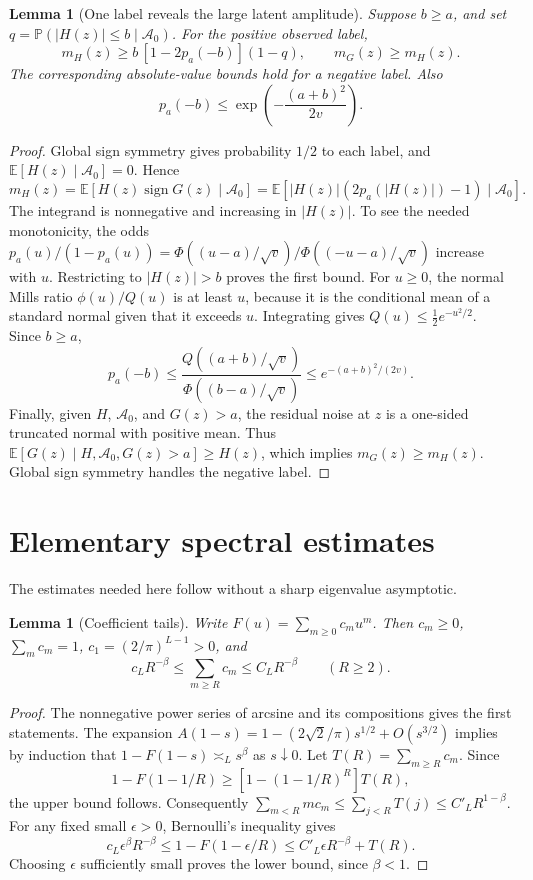 \documentclass[11pt]{article}
\newtheorem{lemma}[theorem]{Lemma}
\newcommand{\E}{\mathbb E}
\newcommand{\Pp}{\mathbb P}
\begin{document}
\begin{lemma}[One label reveals the large latent amplitude]\label{lem:one}
Suppose $b\ge a$, and set $q=\Pp(|H(z)|\le b\mid\mathcal A_0)$. For the positive observed label,
\[
 m_H(z)\ge b\,[1-2p_a(-b)](1-q),\qquad m_G(z)\ge m_H(z).
\]
The corresponding absolute-value bounds hold for a negative label. Also
\[
 p_a(-b)\le\exp\!\left(-\frac{(a+b)^2}{2v}\right).
\]
\end{lemma}
\begin{proof}
Global sign symmetry gives probability $1/2$ to each label, and $\E[H(z)\mid\mathcal A_0]=0$. Hence
\[
 m_H(z)=\E[H(z)\operatorname{sign}G(z)\mid\mathcal A_0]
 =\E[|H(z)|(2p_a(|H(z)|)-1)\mid\mathcal A_0].
\]
The integrand is nonnegative and increasing in $|H(z)|$. To see the needed monotonicity, the odds $p_a(u)/(1-p_a(u))=\Phi((u-a)/\sqrt v)/\Phi((-u-a)/\sqrt v)$ increase with $u$.
Restricting to $|H(z)|>b$ proves the first bound.
For $u\ge0$, the normal Mills ratio $\phi(u)/Q(u)$ is at least $u$, because it is the conditional mean of a standard normal given that it exceeds $u$.
Integrating gives $Q(u)\le\tfrac12e^{-u^2/2}$.
Since $b\ge a$,
\[
 p_a(-b)\le\frac{Q((a+b)/\sqrt v)}{\Phi((b-a)/\sqrt v)}
 \le e^{-(a+b)^2/(2v)}.
\]
Finally, given $H$, $\mathcal A_0$, and $G(z)>a$, the residual noise at $z$ is a one-sided truncated normal with positive mean. Thus
$\E[G(z)\mid H,\mathcal A_0,G(z)>a]\ge H(z)$, which implies $m_G(z)\ge m_H(z)$. Global sign symmetry handles the negative label.
\end{proof}

\section{Elementary spectral estimates}
The estimates needed here follow without a sharp eigenvalue asymptotic.

\begin{lemma}[Coefficient tails]\label{lem:coeff}
Write $F(u)=\sum_{m\ge0}c_m u^m$. Then $c_m\ge0$, $\sum_m c_m=1$, $c_1=(2/\pi)^{L-1}>0$, and
\[
 c_L R^{-\beta}\le\sum_{m\ge R}c_m\le C_L R^{-\beta}
 \qquad(R\ge2).
\]
\end{lemma}
\begin{proof}
The nonnegative power series of arcsine and its compositions gives the first statements. The expansion
$A(1-s)=1-(2\sqrt2/\pi)s^{1/2}+O(s^{3/2})$
implies by induction that
$1-F(1-s)\asymp_L s^\beta$ as $s\downarrow0$.
Let $T(R)=\sum_{m\ge R}c_m$. Since
\[
 1-F(1-1/R)\ge[1-(1-1/R)^R]T(R),
\]
the upper bound follows. Consequently
$\sum_{m<R}m c_m\le\sum_{j<R}T(j)\le C'_L R^{1-\beta}$.
For any fixed small $\epsilon>0$, Bernoulli's inequality gives
\[
 c_L\epsilon^\beta R^{-\beta}
 \le 1-F(1-\epsilon/R)
 \le C'_L\epsilon R^{-\beta}+T(R).
\]
Choosing $\epsilon$ sufficiently small proves the lower bound, since $\beta<1$.
\end{proof}
\end{document}
